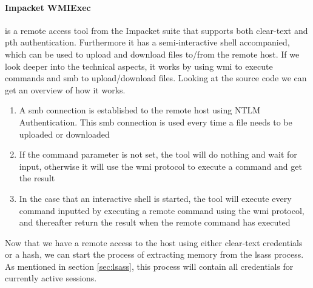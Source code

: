 \documentclass{article}
\begin{document}
\paragraph{Impacket WMIExec} is a remote access tool from the Impacket suite that supports both clear-text and \gls{pth} authentication. Furthermore it has a semi-interactive shell accompanied, which can be used to upload and download files to/from the remote host. If we look deeper into the technical aspects, it works by using \gls{wmi} to execute commands and \gls{smb} to upload/download files. Looking at the source code\cite{url:impacket:wmiexec} we can get an overview of how it works.

\begin{enumerate}
    \item A \gls{smb} connection is established to the remote host using NTLM Authentication. This \gls{smb} connection is used every time a file needs to be uploaded or downloaded
    \item If the command parameter is not set, the tool will do nothing and wait for input, otherwise it will use the \gls{wmi} protocol to execute a command and get the result
    \item In the case that an interactive shell is started, the tool will execute every command inputted by executing a remote command using the \gls{wmi} protocol, and thereafter return the result when the remote command has executed
\end{enumerate}

Now that we have a remote access to the host using either clear-text credentials or a hash, we can start the process of extracting memory from the \gls{lsass} process. As mentioned in section \ref{sec:lsass}, this process will contain all credentials for currently active sessions.
\end{document}
